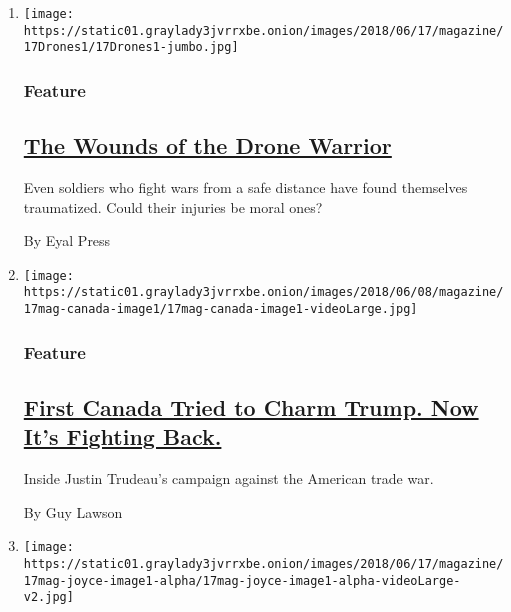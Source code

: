 \begin{enumerate}
\def\labelenumi{\arabic{enumi}.}
\item
  \texttt{[image: https://static01.graylady3jvrrxbe.onion/images/2018/06/17/magazine/17Drones1/17Drones1-jumbo.jpg]}

  \hypertarget{feature}{%
  \subsubsection{Feature}\label{feature}}

  \hypertarget{the-wounds-of-the-drone-warrior}{%
  \subsection{\texorpdfstring{\href{/2018/06/13/magazine/veterans-ptsd-drone-warrior-wounds.html}{The
  Wounds of the Drone
  Warrior}}{The Wounds of the Drone Warrior}}\label{the-wounds-of-the-drone-warrior}}

  Even soldiers who fight wars from a safe distance have found
  themselves traumatized. Could their injuries be moral ones?

  By Eyal Press
\item
  \texttt{[image: https://static01.graylady3jvrrxbe.onion/images/2018/06/08/magazine/17mag-canada-image1/17mag-canada-image1-videoLarge.jpg]}

  \hypertarget{feature-1}{%
  \subsubsection{Feature}\label{feature-1}}

  \hypertarget{first-canada-tried-to-charm-trump-now-its-fighting-back}{%
  \subsection{\texorpdfstring{\href{/2018/06/09/magazine/justin-trudeau-chrystia-freeland-trade-canada-us-.html}{First
  Canada Tried to Charm Trump. Now It's Fighting
  Back.}}{First Canada Tried to Charm Trump. Now It's Fighting Back.}}\label{first-canada-tried-to-charm-trump-now-its-fighting-back}}

  Inside Justin Trudeau's campaign against the American trade war.

  By Guy Lawson
\item
  \texttt{[image: https://static01.graylady3jvrrxbe.onion/images/2018/06/17/magazine/17mag-joyce-image1-alpha/17mag-joyce-image1-alpha-videoLarge-v2.jpg]}


\end{enumerate}

